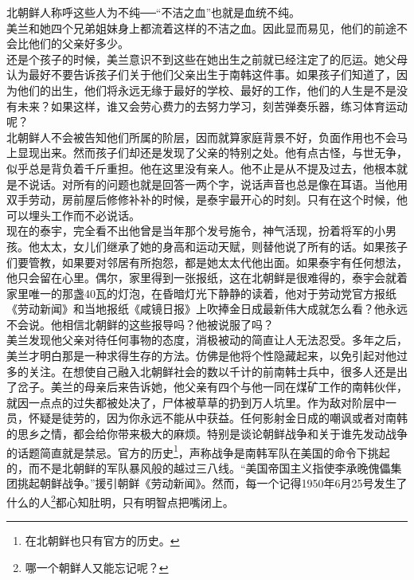 北朝鲜人称呼这些人为不纯──“不洁之血”也就是血统不纯。\\

美兰和她四个兄弟姐妹身上都流着这样的不洁之血。因此显而易见，他们的前途不会比他们的父亲好多少。\\

还是个孩子的时候，美兰意识不到这些在她出生之前就已经注定了的厄运。她父母认为最好不要告诉孩子们关于他们父亲出生于南韩这件事。如果孩子们知道了，因为他们的出生，他们将永远无缘于最好的学校、最好的工作，他们的人生是不是没有未来？如果这样，谁又会劳心费力的去努力学习，刻苦弹奏乐器，练习体育运动呢？\\

北朝鲜人不会被告知他们所属的阶层，因而就算家庭背景不好，负面作用也不会马上显现出来。然而孩子们却还是发现了父亲的特别之处。他有点古怪，与世无争，似乎总是背负着千斤重担。他在这里没有亲人。他不止是从不提及过去，他根本就是不说话。对所有的问题也就是回答一两个字，说话声音也总是像在耳语。当他用双手劳动，房前屋后修修补补的时候，是泰宇最开心的时刻。只有在这个时候，他可以埋头工作而不必说话。\\

现在的泰宇，完全看不出他曾是当年那个发号施令，神气活现，扮着将军的小男孩。他太太，女儿们继承了她的身高和运动天赋，则替他说了所有的话。如果孩子们要管教，如果要对邻居有所抱怨，都是她太太代他出面。如果泰宇有任何想法，他只会留在心里。偶尔，家里得到一张报纸，这在北朝鲜是很难得的，泰宇会就着家里唯一的那盏40瓦的灯泡，在昏暗灯光下静静的读着，他对于劳动党官方报纸《劳动新闻》和当地报纸《咸镜日报》上吹捧金日成最新伟大成就怎么看？他永远不会说。他相信北朝鲜的这些报导吗？他被说服了吗？\\

美兰发现他父亲对待任何事物的态度，消极被动的简直让人无法忍受。多年之后，美兰才明白那是一种求得生存的方法。仿佛是他将个性隐藏起来，以免引起对他过多的关注。在想使自己融入北朝鲜社会的数以千计的前南韩士兵中，很多人还是出了岔子。美兰的母亲后来告诉她，他父亲有四个与他一同在煤矿工作的南韩伙伴，就因一点点的过失都被处决了，尸体被草草的扔到万人坑里。作为敌对阶层中一员，怀疑是徒劳的，因为你永远不能从中获益。任何影射金日成的嘲讽或者对南韩的思乡之情，都会给你带来极大的麻烦。特别是谈论朝鲜战争和关于谁先发动战争的话题简直就是禁忌。官方的历史\footnote{在北朝鲜也只有官方的历史。}，声称战争是南韩军队在美国的命令下挑起的，而不是北朝鲜的军队暴风般的越过三八线。“美国帝国主义指使李承晚傀儡集团挑起朝鲜战争。”援引朝鲜《劳动新闻》。然而，每一个记得1950年6月25号发生了什么的人\footnote{哪一个朝鲜人又能忘记呢？}都心知肚明，只有明智点把嘴闭上。\\

